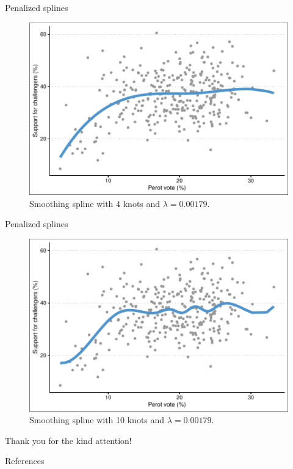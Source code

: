\documentclass[12pt,english,pdf,xcolor=dvipsnames,aspectratio=169,handout]{beamer}\usepackage[]{graphicx}\usepackage[]{xcolor}
\begin{document}
\begin{frame}{Penalized splines}


  
\begin{figure}
  \centering
  \includegraphics[scale=0.7]{../04-graphs/04-10}
  \caption{Smoothing spline with 4 knots and $\lambda=0.00179$.}
\end{figure}  

\end{frame}



\begin{frame}{Penalized splines}

\begin{figure}
  \centering
  \includegraphics[scale=0.7]{../04-graphs/04-11}
  \caption{Smoothing spline with 10 knots and $\lambda=0.00179$.}
\end{figure}  
\end{frame}


\begin{frame}
\begin{center}
    \Huge Thank \textcolor{title}{you} for the kind attention!
\end{center}
\end{frame}


\begin{frame}[allowframebreaks]{References}


\end{frame}
\end{document}
